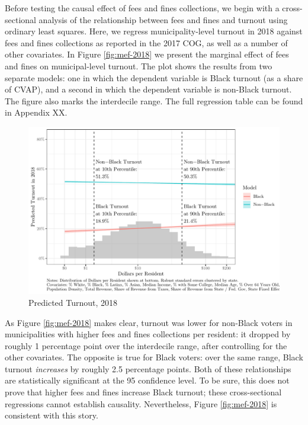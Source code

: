 \documentclass[
  12pt,
]{article}
\begin{document}
Before testing the causal effect of fees and fines collections, we begin with a cross-sectional analysis of the relationship between fees and fines and turnout using ordinary least squares. Here, we regress municipality-level turnout in 2018 against fees and fines collections as reported in the 2017 COG, as well as a number of other covariates. In Figure \ref{fig:mef-2018} we present the marginal effect of fees and fines on municipal-level turnout. The plot shows the results from two separate models: one in which the dependent variable is Black turnout (as a share of CVAP), and a second in which the dependent variable is non-Black turnout. The figure also marks the interdecile range. The full regression table can be found in Appendix XX.

\begin{figure}[H]

{\centering \includegraphics{draft_paper_files/figure-latex/cross-18-1} 

}

\caption{\label{fig:mef-2018}Predicted Turnout, 2018}\label{fig:cross-18}
\end{figure}

As Figure \ref{fig:mef-2018} makes clear, turnout was lower for non-Black voters in municipalities with higher fees and fines collections per resident: it dropped by roughly 1 percentage point over the interdecile range, after controlling for the other covariates. The opposite is true for Black voters: over the same range, Black turnout \emph{increases} by roughly 2.5 percentage points. Both of these relationships are statistically significant at the 95 confidence level. To be sure, this does not prove that higher fees and fines increase Black turnout; these cross-sectional regressions cannot establish causality. Nevertheless, Figure \ref{fig:mef-2018} is consistent with this story.
\end{document}

